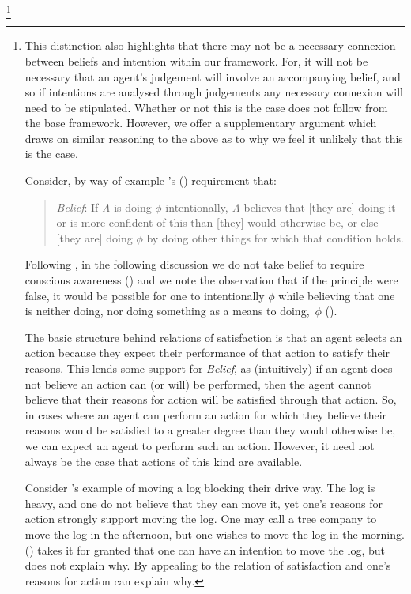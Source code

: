 \documentclass[10pt]{article}
\begin{document}
\footnote{
This distinction also highlights that there may not be a necessary connexion between beliefs and intention within our framework.
For, it will not be necessary that an agent's judgement will involve an accompanying belief, and so if intentions are analysed through judgements any necessary connexion will need to be stipulated.
Whether or not this is the case does not follow from the base framework.
However, we offer a supplementary argument which draws on similar reasoning to the above as to why we feel it unlikely that this is the case.


Consider, by way of example \citeauthor{Setiya:2008aa}'s (\citeyear[391]{Setiya:2008aa}) requirement that:
\begin{quote}
\emph{Belief}: If \emph{A} is doing \(\phi\) intentionally, \emph{A} believes that [they are] doing it or is more confident of this than [they] would otherwise be, or else [they are] doing \(\phi\) by doing other things for which that condition holds.
\end{quote}
Following \citeauthor{Setiya:2008aa}, in the following discussion we do not take belief to require conscious awareness (\citeyear[389]{Setiya:2008aa}) and we note the observation that if the principle were false, it would be possible for one to intentionally \(\phi\) while believing that one is neither doing, nor doing something as a means to doing,~\(\phi\) (\citeyear[390]{Setiya:2008aa}).

The basic structure behind relations of satisfaction is that an agent selects an action because they expect their performance of that action to satisfy their reasons.
This lends some support for \emph{Belief}, as (intuitively) if an agent does not believe an action can (or will) be performed, then the agent cannot believe that their reasons for action will be satisfied through that action.
So, in cases where an agent can perform an action for which they believe their reasons would be satisfied to a greater degree than they would otherwise be, we can expect an agent to perform such an action.
However, it need not always be the case that actions of this kind are available.

Consider \citeauthor{Bratman:1987aa}'s example of moving a log blocking their drive way.
The log is heavy, and one do not believe that they can move it, yet one's reasons for action strongly support moving the log.
One may call a tree company to move the log in the afternoon, but one wishes to move the log in the morning.
(\citeyear[39]{Bratman:1987aa})
\citeauthor{Bratman:1987aa} takes it for granted that one can have an intention to move the log, but does not explain why.
By appealing to the relation of satisfaction and one's reasons for action can explain why.

}
\end{document}
